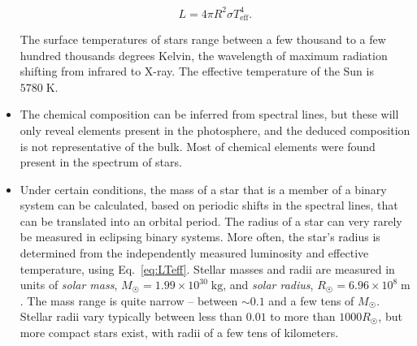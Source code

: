 \documentclass[]{article}
\newcommand{\unit}[1]{\;\mathrm{#1}}
\newcommand{\Sun}{\astrosun}
\begin{document}
\begin{itemize}
\begin{equation}\label{eq:LTeff}
L=4\pi{R}^2\sigma{T}_\text{eff}^4.
\end{equation}

The surface temperatures of stars range between a few thousand to a few hundred
thousands degrees Kelvin, the wavelength of maximum radiation shifting from
infrared to X-ray. The effective temperature of the Sun is $5780\unit{K}$.

\item The chemical composition can be inferred from spectral lines, but these
will only reveal elements present in the photosphere, and the deduced
composition is not representative of the bulk. Most of chemical elements were
found present in the spectrum of stars.

\item Under certain conditions, the mass of a star that is a member of a binary
system can be calculated, based on periodic shifts in the spectral lines, that
can be translated into an orbital period. The radius of a star can very rarely
be measured in eclipsing binary systems. More often, the star's radius is
determined from the independently measured luminosity and effective temperature,
using Eq.~\eqref{eq:LTeff}. Stellar masses and radii are measured in units of
\emph{solar mass}, $M_{\Sun}=1.99\times10^{30}\unit{kg}$, and \emph{solar
radius}, $R_{\Sun}=6.96\times10^8\unit{m}$. The mass range is quite narrow --
between $\sim{0.1}$ and a few tens of $M_{\Sun}$. Stellar radii vary typically
between less than $0.01$ to more than $1000 R_{\Sun}$, but more compact stars
exist, with radii of a few tens of kilometers.

\end{itemize}
\end{document}
